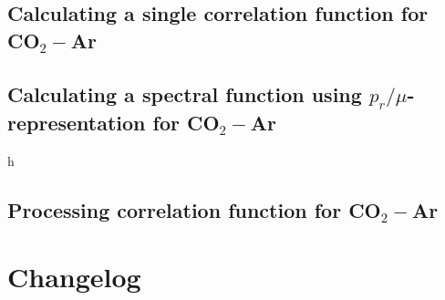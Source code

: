 \documentclass{article}
\begin{document}
\subsection{Calculating a single correlation function for CO$_2-$Ar}
\label{subsec:example-correlation-co2-ar}

\subsection{Calculating a spectral function using $p_r/\mu$-representation for CO$_2-$Ar}
\label{subsec:example-prmu-co2-ar}
h
\subsection{Processing correlation function for CO$_2-$Ar}
\label{subsec:example-processing}

\section{Changelog}
\label{sec:changelog}
\end{document}
